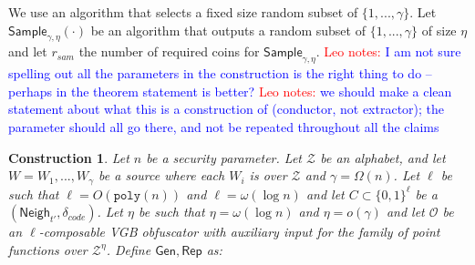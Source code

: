 \documentclass[11pt]{article}
\newcommand{\class}[1]{{\ensuremath{\mathsf{#1}}}}
\newcommand{\gen}{\ensuremath{\class{Gen}}\xspace}
\newcommand{\rep}{\ensuremath{\class{Rep}}\xspace}
\newcommand{\zo}{\ensuremath{\{0, 1\}}}
\newcommand{\sample}{\ensuremath{\class{Sample}}\xspace}
\newcommand{\neigh}{\ensuremath{\class{Neigh}}\xspace}
\newcommand{\poly}{\ensuremath{\mathtt{poly}}\xspace}
\newtheorem{construction}[theorem]{Construction}
\newcommand{\authnote}[2]{{\textcolor{red}{\textsf{#1 notes: }\textcolor{blue}{ #2}}\marginpar{\textcolor{red}{\textbf{!!!!!}}}}}
\newcommand{\authnote}[2]{}
\newcommand{\lnote}[1]{{\authnote{Leo}{#1}}}
\begin{document}
We use an algorithm that selects a fixed size random subset of $\{1,..., \gamma\}$.  Let $\sample_{\gamma, \eta}(\cdot)$ be an algorithm that outputs a random subset of $\{1,..., \gamma\}$ of size $\eta$ and let $r_{sam}$ the number of required coins for $\sample_{\gamma, \eta}$.
\lnote{I am not sure spelling out all the parameters in the construction is the right thing to do -- perhaps in the theorem statement is better?} \lnote{we should make a clean statement about what this is a construction of (conductor, not extractor); the parameter should all go there, and not be repeated throughout all the claims}
\begin{construction}
\label{cons:sampling}
Let $n$ be a security parameter.
Let $\mathcal{Z}$ be an alphabet, and let $W = W_1,..., W_\gamma$ be a source where each $W_i$ is over $\mathcal{Z}$ and $\gamma = \Omega(n)$.  Let $\ell$ be such that $\ell = O(\poly(n))$ and $\ell = \omega(\log n)$ and let $C\subset \zo^\ell$ be a $(\neigh_{t'}, \delta_{code})$.   Let $\eta$ be such that $\eta = \omega(\log n)$ and $\eta = o(\gamma)$ and let $\mathcal{O}$ be an $\ell$-composable VGB obfuscator with auxiliary input for the family of point functions over $ \mathcal{Z}^\eta$.  Define $\gen, \rep$ as:


\end{construction}
\end{document}
